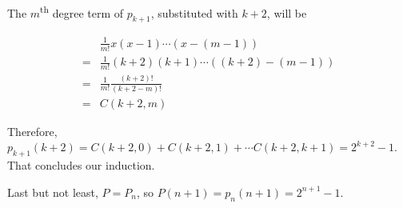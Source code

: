 \documentclass{article}
\begin{document}
The $ m $\textsuperscript{th} degree term of $ p_{k+1} $, substituted with $ k + 2 $, will be

\begin{align*}
   & \frac{1}{m!}x(x-1)\cdots(x-(m-1))         \\
  =& \frac{1}{m!}(k+2)(k+1)\cdots((k+2)-(m-1)) \\
  =& \frac{1}{m!}\frac{(k+2)!}{(k+2 - m)!}     \\
  =& C(k+2, m)
\end{align*}

Therefore, $ p_{k+1}(k+2) = C(k+2, 0) + C(k+2, 1) + \cdots C(k+2, k+1) = 2^{k+2} - 1 $. That concludes our induction.

Last but not least, $ P = P_n $, so $ P(n + 1) = p_n(n + 1) = 2^{n+1} - 1 $.
\end{document}
